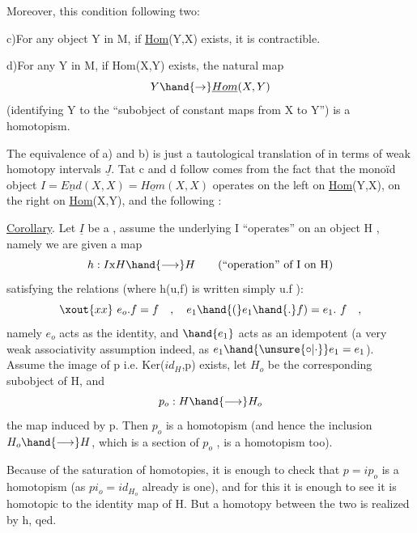 Moreover,  this condition  following two:

c)\quad For any object Y in M, if \underline{Hom}(Y,X) exists, it is contractible.

d)\quad For any Y in M, if Hom(X,Y) exists, the natural map
\[ Y \hand{\to} \underline{Hom}(X,Y) \]
(identifying Y to the ``subobject of constant maps from X to Y'') is a
homotopism.

The equivalence of a) and b) is just a tautological translation
of   in terms of  weak homotopy intervals $\underline{J}$.
Tat c\hand{)} and d\hand{)} follow comes from the fact that the monoïd object
$I = \underline{End}(X,X) = \underline{Hom}(X,X)$ operates on the left on \underline{Hom}(Y,X), on the right
on \underline{Hom}(X,Y), and the following :

\uline{Corollary}. Let $\underline{I}$ be a , assume the underlying I
``operates'' on an object H , namely we are given a map
\[ h: I\mathrm{x}H \hand{\longrightarrow} H \qquad (\text{``operation'' of I on H}) \]
satisfying the relations (where h(u,f) is written simply u.f ):
\[ \xout{xx}\ e_o.f = f \quad , \quad e_1\hand{(}e_1\hand{.}f) = e_1.\ f \quad , \]
namely $e_o$ acts as the identity, and $\hand{e_1}$ acts as an idempotent  (a very
weak associativity assumption indeed, as $e_1\hand{\unsure{\circ|\cdot}}e_1 = e_1$). Assume the image
of p i.e. Ker($id_H$,p) exists, let $H_o$ be the corresponding subobject of
H, and 
\[ p_o : H \hand{\longrightarrow} H_o \]
the map induced by p. Then $p_o$ is a homotopism (and hence the inclusion
$H_o \hand{\longrightarrow} H$, which is a section of $p_o$ , is a homotopism too).

Because of the saturation  of homotopies, it is enough to
check that $p = ip_o$ is a homotopism (as $pi_o = id_{H_o}$ already is one), and
for this it is enough to see it is homotopic to the identity map of H.
But a homotopy between the two is realized by h,  qed.

